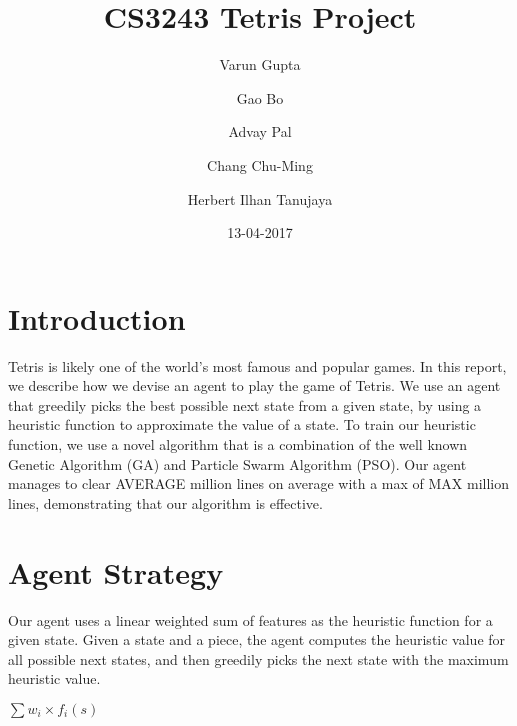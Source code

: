 \documentclass{article}
\title{CS3243 Tetris Project}
\author{Varun Gupta \and Gao Bo \and Advay Pal \and Chang Chu-Ming \and Herbert Ilhan Tanujaya}
\date{13-04-2017}
\begin{document}
	\maketitle
	\thispagestyle{empty}
	\vspace{5mm}

    \section{Introduction}
    Tetris is likely one of the world's most famous and popular games.
    In this report, we describe how we devise an agent to play the game of Tetris.
    We use an agent that greedily picks the best possible next state from a given state,
    by using a heuristic function to approximate the value of a state. To train our heuristic
    function, we use a novel algorithm that is a combination of the well known Genetic Algorithm (GA)
    and Particle Swarm Algorithm (PSO). Our agent manages to clear AVERAGE million lines on average with a max
    of MAX million lines, demonstrating that our algorithm is effective.

    \section{Agent Strategy}
    Our agent uses a linear weighted sum of features as the heuristic function for a given state. Given a state and a piece, the agent computes
    the heuristic value for all possible next states, and then greedily picks the next state with
    the maximum heuristic value.

	\begin{center}
		$\sum w_i \times f_i(s)$
	\end{center}
\end{document}
